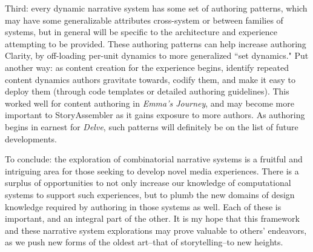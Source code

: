 Third: every dynamic narrative system has some set of authoring patterns, which may have some generalizable attributes cross-system or between families of systems, but in general will be specific to the architecture and experience attempting to be provided. These authoring patterns can help increase authoring Clarity, by off-loading per-unit dynamics to more generalized ``set dynamics." Put another way: as content creation for the experience begins, identify repeated content dynamics authors gravitate towards, codify them, and make it easy to deploy them (through code templates or detailed authoring guidelines). This worked well for content authoring in \textit{Emma's Journey}, and may become more important to StoryAssembler as it gains exposure to more authors. As authoring begins in earnest for \textit{Delve}, such patterns will definitely be on the list of future developments.

To conclude: the exploration of combinatorial narrative systems is a fruitful and intriguing area for those seeking to develop novel media experiences. There is a surplus of opportunities to not only increase our knowledge of computational systems to support such experiences, but to plumb the new domains of design knowledge required by authoring in those systems as well. Each of these is important, and an integral part of the other. It is my hope that this framework and these narrative system explorations may prove valuable to others' endeavors, as we push new forms of the oldest art--that of storytelling--to new heights.